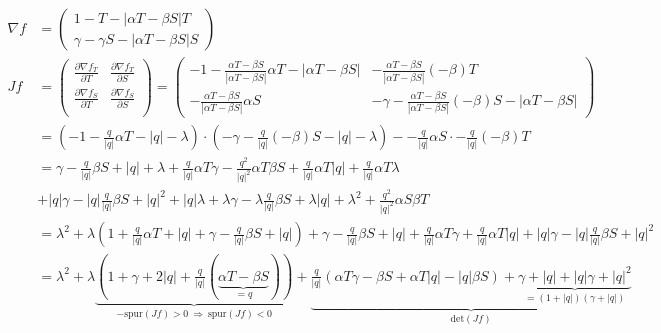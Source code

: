 \documentclass[a4paper,twoside]{article}
\begin{document}
	\begin{footnotesize}
	\begin{align*}
		\nabla f &= \left(\begin{array}{c}
			1 - T - |\alpha T - \beta S|T \\
			\gamma - \gamma S - |\alpha T - \beta S|S
		\end{array}\right) \\
		Jf &= \left(\begin{array}{cc}
			\frac{\partial \nabla f_T}{\partial T} & \frac{\partial \nabla f_T}{\partial S} \\
			\frac{\partial \nabla f_S}{\partial T} & \frac{\partial \nabla f_S}{\partial S} \\
		\end{array}\right) = \left(\begin{array}{cc}
			-1 - \frac{\alpha T - \beta S}{|\alpha T - \beta S|}\alpha T - |\alpha T - \beta S| &
			-\frac{\alpha T - \beta S}{|\alpha T - \beta S|}(-\beta) T \\
			-\frac{\alpha T - \beta S}{|\alpha T - \beta S|}\alpha S &
			-\gamma -\frac{\alpha T - \beta S}{|\alpha T - \beta S|}(-\beta) S - |\alpha T - \beta S|
		\end{array}\right) \\
		&= \left(-1 - \frac{q}{|q|}\alpha T - |q| - \lambda\right)\cdot \left( -\gamma - \frac{q}{|q|}(-\beta) S - |q|- \lambda \right) - -\frac{q}{|q|}\alpha S \cdot  -\frac{q}{|q|}(-\beta) T \\
		&= \gamma - \frac{q}{|q|}\beta S + |q| + \lambda 
		+ \frac{q}{|q|}\alpha T\gamma - \frac{q^2}{|q|^2}\alpha T \beta S + \frac{q}{|q|} \alpha T |q| + \frac{q}{|q|}\alpha T\lambda \\
		&+ |q|\gamma - |q|\frac{q}{|q|} \beta S + |q|^2 + |q|\lambda
		+ \lambda \gamma - \lambda\frac{q}{|q|}\beta S + \lambda|q| + \lambda^2
		+ \frac{q^2}{|q|^2}\alpha S \beta T \\
		&= \lambda^2 + \lambda\left( 1 + \frac{q}{|q|}\alpha T + |q| + \gamma - \frac{q}{|q|}\beta S + |q| \right) 
		+ \gamma - \frac{q}{|q|}\beta S + |q| + \frac{q}{|q|}\alpha T \gamma + \frac{q}{|q|}\alpha T |q| + |q|\gamma - |q|\frac{q}{|q|}\beta S + |q|^2 \\
		&= \lambda^2 + \lambda \underbrace{\left( 
		1  + \gamma + 2|q| + \frac{q}{|q|} \left( \underbrace{\alpha T - \beta S}_{=q} \right)
		\right)}_{-\textrm{spur}(Jf) > 0 ~\Rightarrow~ \textrm{spur}(Jf) < 0} +
		\underbrace{
			\frac{q}{|q|}\left(\alpha T \gamma - \beta S + \alpha T |q| - |q|\beta S\right)
			 + \underbrace{\gamma + |q| + |q|\gamma + |q|^2}_{=(1 + |q|)(\gamma + |q|)}
		}_{\textrm{det}(Jf)}
	\end{align*}		
	\end{footnotesize}
\end{document}
